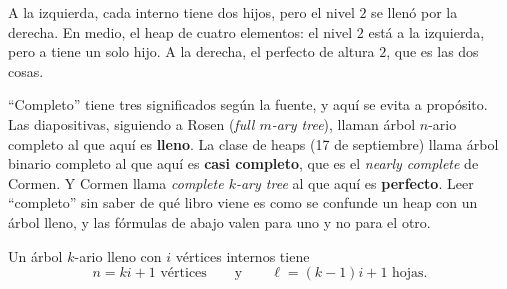 \documentclass[11pt,letterpaper]{article}
\begin{document}
\begin{center}
\end{center}

A la izquierda, cada interno tiene dos hijos, pero el nivel $2$ se
llenó por la derecha. En medio, el heap de cuatro elementos: el
nivel $2$ está a la izquierda, pero a tiene un solo hijo. A la
derecha, el perfecto de altura $2$, que es las dos cosas.

\begin{ojo}
  ``Completo'' tiene tres significados según la fuente, y aquí se
  evita a propósito. Las diapositivas, siguiendo a Rosen
  (\textit{full $m$-ary tree}), llaman árbol $n$-ario completo al que
  aquí es \textbf{lleno}. La clase de heaps (17 de septiembre) llama
  árbol binario completo al que aquí es \textbf{casi completo}, que
  es el \textit{nearly complete} de Cormen. Y Cormen llama
  \textit{complete $k$-ary tree} al que aquí es \textbf{perfecto}.
  Leer ``completo'' sin saber de qué libro viene es como se confunde
  un heap con un árbol lleno, y las fórmulas de abajo valen para uno
  y no para el otro.
\end{ojo}

\begin{teorema}
  \label{teo:arbol-conteo}
  Un árbol $k$-ario lleno con $i$ vértices internos tiene
  \[
    n = ki + 1 \text{ vértices} \qquad \text{y} \qquad
    \ell = (k - 1)i + 1 \text{ hojas.}
  \]
\end{teorema}
\end{document}
